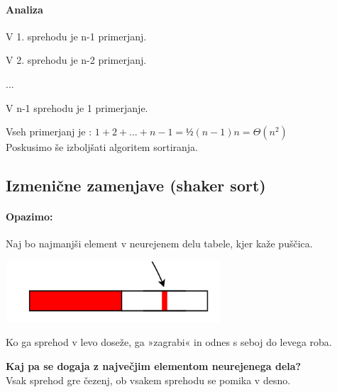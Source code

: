 \documentclass[a4paper,10pt]{article}
\begin{document}
\paragraph{Analiza}
\begin{list}{}{}
\item V 1. sprehodu je n-1 primerjanj.
\item V 2. sprehodu je n-2 primerjanj.
\item ...
\item V n-1 sprehodu je 1 primerjanje.
\end{list}
Vseh primerjanj je : $1+2+...+n-1 = ½(n-1)n = \Theta(n^2)$\\
Poskusimo \v se izbolj\v sati algoritem sortiranja.

\subsection{Izmeni\v cne zamenjave (shaker sort)}

\paragraph{Opazimo:}
Naj bo najmanj\v si element v neurejenem delu tabele, kjer ka\v ze pu\v s\v cica.

	\begin{center}
	\includegraphics[width=8.05cm,height=2.3cm]{Slike/IzmenicneZamenjaveTabela.png}
	\end{center}

Ko ga sprehod v levo dose\v ze, ga »zagrabi« in odnes s seboj do levega roba. \\

\begin{flushleft}
\textbf{Kaj pa se dogaja z najve\v cjim elementom neurejenega dela?} \\
Vsak sprehod gre \v cezenj, ob vsakem sprehodu se pomika v desno.
\end{flushleft}
\end{document}
